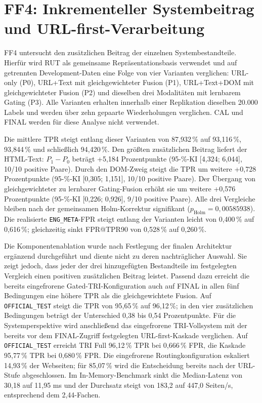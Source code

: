 \section{FF4: Inkrementeller Systembeitrag und URL-first-Verarbeitung}

FF4 untersucht den zusätzlichen Beitrag der einzelnen Systembestandteile. Hierfür wird RUT
als gemeinsame Repräsentationsbasis verwendet und auf getrennten Development-Daten eine
Folge von vier Varianten verglichen: URL-only (P0), URL+Text mit gleichgewichteter Fusion
(P1), URL+Text+DOM mit gleichgewichteter Fusion (P2) und dieselben drei Modalitäten mit
lernbarem Gating (P3). Alle Varianten erhalten innerhalb einer Replikation dieselben
20.000 Labels und werden über zehn gepaarte Wiederholungen verglichen. CAL und FINAL
werden für diese Analyse nicht verwendet.

Die mittlere TPR steigt entlang dieser Varianten von 87,932\,\% auf 93,116\,\%, 93,844\,\%
und schließlich 94,420\,\%. Den größten zusätzlichen Beitrag liefert der HTML-Text:
$P_1-P_0$ beträgt +5,184 Prozentpunkte (95-\%-KI [4,324; 6,044], 10/10 positive Paare).
Durch den DOM-Zweig steigt die TPR um weitere +0,728 Prozentpunkte
(95-\%-KI [0,305; 1,151], 10/10 positive Paare). Der Übergang von gleichgewichteter zu
lernbarer Gating-Fusion erhöht sie um weitere +0,576 Prozentpunkte
(95-\%-KI [0,226; 0,926], 9/10 positive Paare). Alle drei Vergleiche bleiben nach der
gemeinsamen Holm-Korrektur signifikant
($p_{\mathrm{Holm}}=0{,}00585938$). Die realisierte \nolinkurl{ENG_META}-FPR steigt entlang
der Varianten leicht von 0,400\,\% auf 0,616\,\%; gleichzeitig sinkt FPR@TPR90 von
0,528\,\% auf 0,260\,\%.

Die Komponentenablation wurde nach Festlegung der finalen Architektur ergänzend durchgeführt
und diente nicht zu deren nachträglicher Auswahl. Sie zeigt jedoch, dass jeder der drei
hinzugefügten Bestandteile im festgelegten Vergleich einen positiven zusätzlichen Beitrag leistet.
Passend dazu erreicht die bereits eingefrorene Gated-TRI-Konfiguration auch auf FINAL in allen
fünf Bedingungen eine höhere TPR als die gleichgewichtete Fusion. Auf
\nolinkurl{OFFICIAL_TEST} steigt die TPR von 95,65\,\% auf 96,12\,\%; in den vier
zusätzlichen Bedingungen beträgt der Unterschied 0,38 bis 0,54 Prozentpunkte. Für die Systemperspektive wird anschließend das eingefrorene TRI-Vollsystem mit der bereits vor
dem FINAL-Zugriff festgelegten URL-first-Kaskade verglichen. Auf \nolinkurl{OFFICIAL_TEST}
erreicht TRI Full 96,12\,\% TPR bei 0,666\,\% FPR, die Kaskade 95,77\,\% TPR bei
0,680\,\% FPR. Die eingefrorene Routingkonfiguration eskaliert 14,93\,\% der Webseiten;
für 85,07\,\% wird die Entscheidung bereits nach der URL-Stufe abgeschlossen. Im
In-Memory-Benchmark sinkt die Median-Latenz von 30,18 auf 11,95 ms und der Durchsatz
steigt von 183,2 auf 447,0 Seiten/s, entsprechend dem 2,44-Fachen.

